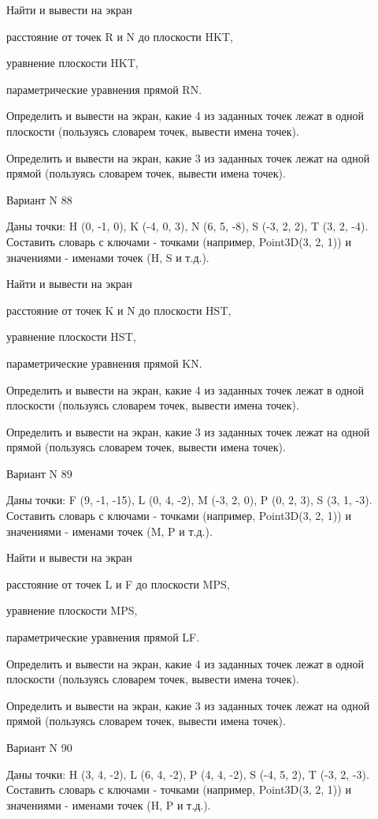 \documentclass[11pt]{report}
\begin{document}
 
Найти и вывести на экран


расстояние от точек R и N до плоскости HKT,

 
уравнение плоскости HKT,

 
параметрические уравнения прямой RN.


Определить и вывести на экран, какие 4 из заданных точек лежат в одной плоскости (пользуясь словарем точек, вывести имена точек).


Определить и вывести на экран, какие 3 из заданных точек лежат на одной прямой (пользуясь словарем точек, вывести имена точек).

Вариант N 88

Даны точки: H (0, -1, 0), K (-4, 0, 3), N (6, 5, -8), S (-3, 2, 2), T (3, 2, -4).
Составить словарь с ключами - точками (например, Point3D(3, 2, 1)) и значениями - именами точек (H, S и т.д.).

 
Найти и вывести на экран


расстояние от точек K и N до плоскости HST,

 
уравнение плоскости HST,

 
параметрические уравнения прямой KN.


Определить и вывести на экран, какие 4 из заданных точек лежат в одной плоскости (пользуясь словарем точек, вывести имена точек).


Определить и вывести на экран, какие 3 из заданных точек лежат на одной прямой (пользуясь словарем точек, вывести имена точек).

Вариант N 89

Даны точки: F (9, -1, -15), L (0, 4, -2), M (-3, 2, 0), P (0, 2, 3), S (3, 1, -3).
Составить словарь с ключами - точками (например, Point3D(3, 2, 1)) и значениями - именами точек (M, P и т.д.).

 
Найти и вывести на экран


расстояние от точек L и F до плоскости MPS,

 
уравнение плоскости MPS,

 
параметрические уравнения прямой LF.


Определить и вывести на экран, какие 4 из заданных точек лежат в одной плоскости (пользуясь словарем точек, вывести имена точек).


Определить и вывести на экран, какие 3 из заданных точек лежат на одной прямой (пользуясь словарем точек, вывести имена точек).

Вариант N 90

Даны точки: H (3, 4, -2), L (6, 4, -2), P (4, 4, -2), S (-4, 5, 2), T (-3, 2, -3).
Составить словарь с ключами - точками (например, Point3D(3, 2, 1)) и значениями - именами точек (H, P и т.д.).
\end{document}
